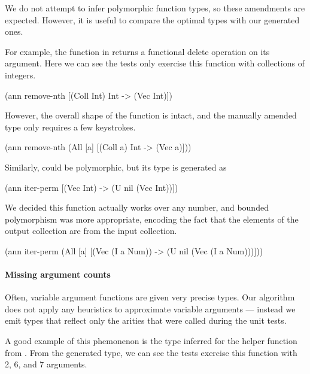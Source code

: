 We do not attempt to infer polymorphic function types, 
so these amendments are expected. However, it is useful
to compare the optimal types with our generated ones.

For example, the  function in 
returns a functional delete operation on its argument.
Here we can see the tests only exercise this function with
collections of integers.

\begin{cljlisting}
(ann remove-nth [(Coll Int) Int -> (Vec Int)])
\end{cljlisting}

However, the overall shape of the function is intact,
and the manually amended type only requires a few 
keystrokes.

\begin{cljlisting}
(ann remove-nth
  (All [a] [(Coll a) Int -> (Vec a)]))
\end{cljlisting}

Similarly,  could be polymorphic, 
but its type is generated as

\begin{cljlisting}
(ann iter-perm [(Vec Int) -> (U nil (Vec Int))])
\end{cljlisting}

We decided this function actually works over any number,
and bounded polymorphism was more appropriate, encoding
the fact that the elements of the output collection
are from the input collection.

\begin{cljlisting}
(ann iter-perm
  (All [a]
    [(Vec (I a Num)) -> (U nil (Vec (I a Num)))]))
\end{cljlisting}
%

\paragraph{Missing argument counts}
Often, variable argument functions are given very precise types.
Our algorithm does not apply any heuristics to approximate
variable arguments --- instead we emit types that reflect
only the arities that were called during the unit tests.

A good example of this phemonenon is the type inferred
for the  helper function from .
From the generated type, we can see the tests exercise this function with 2, 6,
and 7 arguments.

